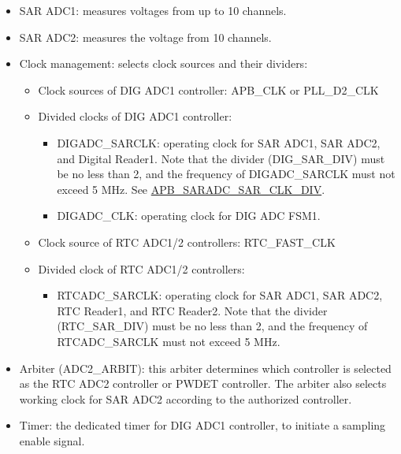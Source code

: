 \documentclass[main\_\_EN.tex]{subfiles}
\begin{document}
\begin{itemize}
    \item SAR ADC1: measures voltages from up to 10 channels.
    \item SAR ADC2: measures the voltage from 10 channels.
    \item Clock management: selects clock sources and their dividers:
            \begin{itemize}
                \item Clock sources of DIG ADC1 controller: APB\_CLK or PLL\_D2\_CLK
                \item Divided clocks of DIG ADC1 controller:
                \begin{itemize}
                    \item DIGADC\_SARCLK: operating clock for SAR ADC1, SAR ADC2, and Digital Reader1. Note that the divider (DIG\_SAR\_DIV) must be no less than 2, and the frequency of DIGADC\_SARCLK must not exceed 5 MHz. See \hyperref[fielddesc:APBSARADCSARCLKDIV]{APB\_SARADC\_SAR\_CLK\_DIV}.
                    \item DIGADC\_CLK: operating clock for DIG ADC FSM1.
                \end{itemize}
                \item Clock source of RTC ADC1/2 controllers: RTC\_FAST\_CLK
                \item Divided clock of RTC ADC1/2 controllers:
                \begin{itemize}
                    \item RTCADC\_SARCLK: operating clock for SAR ADC1, SAR ADC2, RTC Reader1, and RTC Reader2. Note that the divider (RTC\_SAR\_DIV) must be no less than 2, and the frequency of RTCADC\_SARCLK must not exceed 5 MHz.
\end{itemize}
            \end{itemize}
    \item Arbiter (ADC2\_ARBIT): this arbiter determines which controller is selected as the RTC ADC2 controller or PWDET controller. The arbiter also selects working clock for SAR ADC2 according to the authorized controller.

    \item Timer: the dedicated timer for DIG ADC1 controller, to initiate a sampling enable signal.


\end{itemize}
\end{document}
